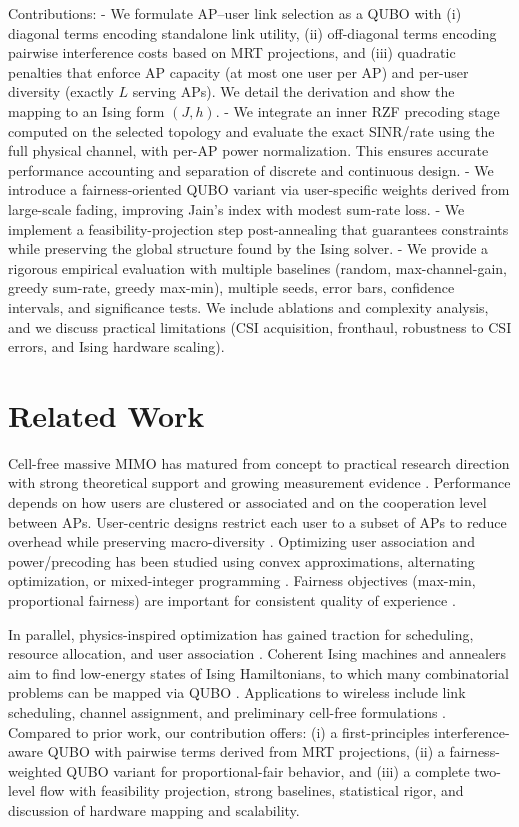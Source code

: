 Contributions:
- We formulate AP–user link selection as a QUBO with (i) diagonal terms encoding standalone link utility, (ii) off-diagonal terms encoding pairwise interference costs based on MRT projections, and (iii) quadratic penalties that enforce AP capacity (at most one user per AP) and per-user diversity (exactly $L$ serving APs). We detail the derivation and show the mapping to an Ising form $(J,h)$.
- We integrate an inner RZF precoding stage computed on the selected topology and evaluate the exact SINR/rate using the full physical channel, with per-AP power normalization. This ensures accurate performance accounting and separation of discrete and continuous design.
- We introduce a fairness-oriented QUBO variant via user-specific weights derived from large-scale fading, improving Jain’s index with modest sum-rate loss. 
- We implement a feasibility-projection step post-annealing that guarantees constraints while preserving the global structure found by the Ising solver.
- We provide a rigorous empirical evaluation with multiple baselines (random, max-channel-gain, greedy sum-rate, greedy max-min), multiple seeds, error bars, confidence intervals, and significance tests. We include ablations and complexity analysis, and we discuss practical limitations (CSI acquisition, fronthaul, robustness to CSI errors, and Ising hardware scaling).

\section{Related Work}
Cell-free massive MIMO has matured from concept to practical research direction with strong theoretical support and growing measurement evidence \cite{ngo2017cell,demir2021foundations,bjornson2019massive}. Performance depends on how users are clustered or associated and on the cooperation level between APs. User-centric designs restrict each user to a subset of APs to reduce overhead while preserving macro-diversity \cite{buzzi2019user,chen2020structured}. Optimizing user association and power/precoding has been studied using convex approximations, alternating optimization, or mixed-integer programming \cite{nayebi2017precoding,bjornson2019making}. Fairness objectives (max-min, proportional fairness) are important for consistent quality of experience \cite{bashar2021max}.


In parallel, physics-inspired optimization has gained traction for scheduling, resource allocation, and user association \cite{kasi2021resource,grassl2022ising}. Coherent Ising machines and annealers aim to find low-energy states of Ising Hamiltonians, to which many combinatorial problems can be mapped via QUBO \cite{lucas2014ising,mcmahon2016fully,inagaki2016coherent,glover2018tutorial}. Applications to wireless include link scheduling, channel assignment, and preliminary cell-free formulations \cite{zhao2022joint}. Compared to prior work, our contribution offers: (i) a first-principles interference-aware QUBO with pairwise terms derived from MRT projections, (ii) a fairness-weighted QUBO variant for proportional-fair behavior, and (iii) a complete two-level flow with feasibility projection, strong baselines, statistical rigor, and discussion of hardware mapping and scalability.

